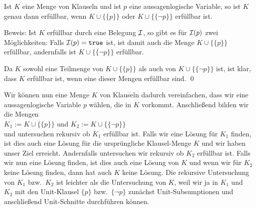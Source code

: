 \begin{Satz}
  Ist $K$ eine Menge von Klauseln und ist $p$ eine aussagenlogische Variable, 
  so ist $K$ genau dann erf\"{u}llbar, wenn $K \cup \bigl\{\{p\}\bigr\}$ oder 
  $K \cup \bigl\{\{\neg p\}\bigr\}$ erf\"{u}llbar ist.  
\end{Satz}
Beweis: 
Ist $K$ erf\"{u}llbar durch eine
Belegung $\mathcal{I}$, so gibt es f\"{u}r  $\mathcal{I}(p)$ zwei M\"{o}glichkeiten:  Falls $\mathcal{I}(p) = \mathtt{true}$ ist, ist
damit auch die Menge $K \cup \bigl\{\{p\}\bigr\}$ erf\"{u}llbar, andernfalls ist
$K \cup \bigl\{\{\neg p\}\bigr\}$ erf\"{u}llbar. 

Da $K$ sowohl eine Teilmenge von $K \cup \bigl\{\{p\}\bigr\}$ als auch von 
$K \cup \bigl\{\{\neg p\}\bigr\}$ ist, ist klar, dass $K$ erf\"{u}llbar
ist, wenn eine dieser Mengen erf\"{u}llbar sind.  
\qed

Wir k\"{o}nnen nun eine Menge $K$ von Klauseln dadurch vereinfachen, dass wir eine
aussagenlogische Variable $p$ w\"{a}hlen, die in $K$ vorkommt.
Anschlie\ss{}end bilden wir die Mengen \\[0.2cm]
\hspace*{1.3cm} $K_1 := K \cup \bigl\{\{p\}\bigr\}$ \quad und \quad $K_2 := K \cup
\bigl\{\{\neg p\}\bigr\}$
\\[0.2cm]
und untersuchen rekursiv ob $K_1$ erf\"{u}llbar ist.  Falls wir eine L\"{o}sung f\"{u}r $K_1$ finden,
ist dies auch eine L\"{o}sung f\"{u}r die urspr\"{u}ngliche Klausel-Menge $K$ und wir haben unser Ziel
erreicht.
Andernfalls untersuchen wir rekursiv ob $K_2$ erf\"{u}llbar ist.
Falls wir nun eine L\"{o}sung finden, ist dies auch eine L\"{o}sung von $K$ und wenn wir f\"{u}r $K_2$
keine L\"{o}sung finden, dann hat auch $K$ keine L\"{o}sung.
Die rekursive Untersuchung von $K_1$ bzw.~$K_2$ ist leichter als die Untersuchung von $K$,
weil wir ja in $K_1$ und $K_2$ mit den Unit-Klausel $\{p\}$ bzw.~$\{\neg p\}$
zun\"{a}chst Unit-Subsumptionen und anschlie\ss{}end Unit-Schnitte durchf\"{u}hren k\"{o}nnen.


